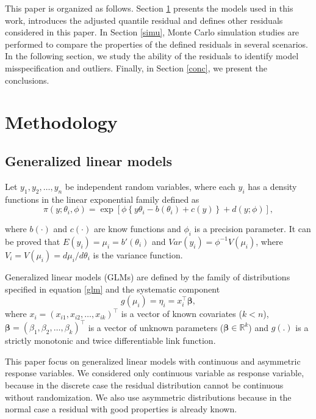 \documentclass[11pt,authoryear,review,3p,times]{elsarticle}
\begin{document}
This paper is organized as follows. Section \ref{method} presents the models used in this work, introduces the adjusted quantile residual and defines other residuals considered in this paper. In Section \ref{simu}, Monte Carlo simulation studies are performed to compare the properties of the defined residuals in several scenarios. In the following section, we study the ability of the residuals to
identify model misspecification and outliers. Finally, in Section \ref{conc}, we present the conclusions.


 \section{Methodology}
 \label{method}
 \subsection{Generalized linear models}
 \label{mod}
  
Let $y_1, y_2, \ldots, y_n$ be independent random variables, where each $y_i$ has a density functions in the linear exponential family defined as
  \begin{equation}
  \pi(y;\theta_i,\phi)= \exp\left[\phi \left\{ y\theta_i-b(\theta_i)+c(y)\right\}+d(y;\phi)\right],
  \label{glm}
  \end{equation}
  
  where $b(\cdot)$ and $c(\cdot)$ are know functions and $\phi_i$ is a precision parameter. It can be proved that $E(y_i)=\mu_i = b'(\theta_i)$ and $Var(y_i)=\phi^{-1}V(\mu_i)$, where $V_i=V(\mu_i)=d\mu_i/d\theta_i$ is the variance function.
  
  Generalized linear models (GLMs) are defined by the family of distributions specified in equation \ref{glm} and the systematic component
  \begin{equation*}
  g(\mu_i) = \eta_i = x_i^\top\boldsymbol{\beta},
  \end{equation*}
  where $x_{i}=(x_{i1},x_{i2},\ldots,x_{ik})^\top$ is a vector of known covariates ($k < n$), $\boldsymbol{\beta}=(\beta_1,\beta_2,\ldots,\beta_k)^\top$ is a vector of unknown parameters ($\boldsymbol{\beta} \in \mathbb{R}^k$) and $g(.)$ is a strictly monotonic and twice differentiable link function.
  
  
 This paper focus on generalized linear models with continuous and asymmetric response variables.
 We considered only continuous variable as response variable, because in the discrete case the residual distribution cannot be continuous without randomization.
We also use asymmetric distributions because in the normal case a residual with good properties is already known.
 
\end{document}
